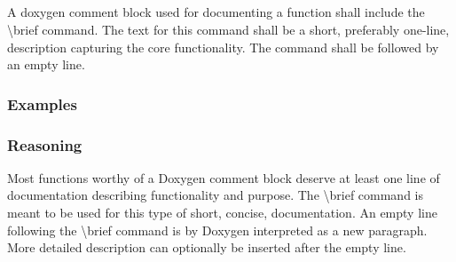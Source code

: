 \subsection*{\doxygenRule{}}

A doxygen comment block used for documenting a function shall include the \textbackslash brief command. The text for this command shall be a short, preferably one-line, description capturing the core functionality. The command shall be followed by an empty line.

\subsubsection*{Examples}

\noindent
\begin{minipage}[t]{0.47\textwidth}
    
\end{minipage}\hfill
\begin{minipage}[t]{0.47\textwidth}
    
\end{minipage}

\subsubsection*{Reasoning}

 Most functions worthy of a Doxygen comment block deserve at least one line of documentation describing functionality and purpose. The \textbackslash brief command is meant to be used for this type of short, concise, documentation. An empty line following the \textbackslash brief command is by Doxygen interpreted as a new paragraph. More detailed description can optionally be inserted after the empty line.
